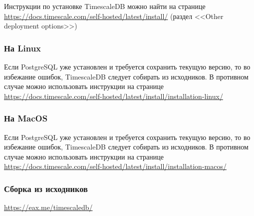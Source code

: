 \documentclass[%
	11pt,
	a4paper,
	utf8,
		]{article}
\begin{document}
Инструкции по установке TimescaleDB можно найти на странице \url{https://docs.timescale.com/self-hosted/latest/install/} (раздел <<Other deployment options>>)

\subsubsection{На Linux}

Если PostgreSQL уже установлен и требуется сохранить текущую версию, то во избежание ошибок, TimescaleDB следует собирать из исходников. В противном случае можно использовать инструкции на странице \url{https://docs.timescale.com/self-hosted/latest/install/installation-linux/}

\subsubsection{На MacOS}

Если PostgreSQL уже установлен и требуется сохранить текущую версию, то во избежание ошибок, TimescaleDB следует собирать из исходников. В противном случае можно использовать инструкции на странице \url{https://docs.timescale.com/self-hosted/latest/install/installation-macos/}

\subsubsection{Сборка из исходников}


\url{https://eax.me/timescaledb/}





\begin{thebibliography}{99}
	
	
	
\end{thebibliography}


\lstlistoflistings{}
\end{document}
